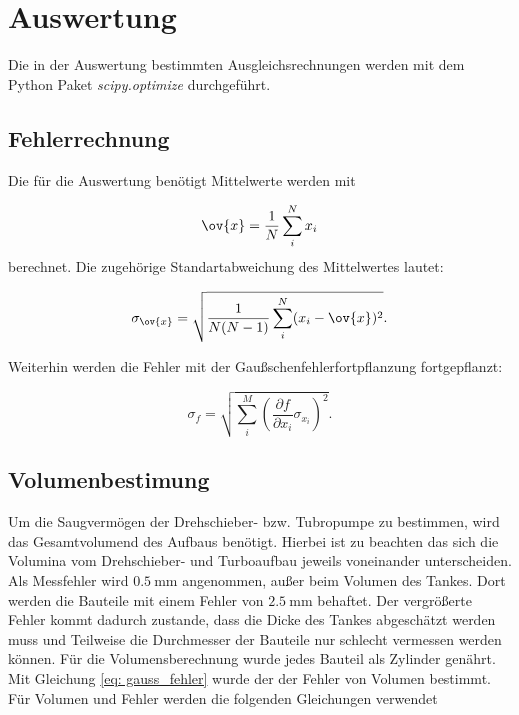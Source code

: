 \section{Auswertung}

Die in der Auswertung bestimmten Ausgleichsrechnungen werden mit
dem Python Paket \emph{scipy.optimize}\cite{scipy} durchgeführt.

\subsection{Fehlerrechnung}

Die für die Auswertung benötigt Mittelwerte werden mit

\begin{equation}
  \label{eq: mittel}
  \ov{x}=\frac{1}{N}\sum_i^N x_i
\end{equation}
berechnet. Die zugehörige Standartabweichung des Mittelwertes lautet:

\begin{equation}
  \label{eq: standartabweichung}
  \sigma_{\ov{x}}=\sqrt{ \frac{1}{N(N-1)} \sum_i^N (x_i-\ov{x})^2}.
\end{equation}

Weiterhin werden die Fehler mit der Gaußschenfehlerfortpflanzung fortgepflanzt:

\begin{equation}
  \label{eq: gauss_fehler}
  \sigma_f= \sqrt{ \sum_i^M \left(\frac{\partial f}{\partial x_i} \sigma_{x_i}\right)^2}.
\end{equation}

\subsection{Volumenbestimung}

Um die Saugvermögen der Drehschieber- bzw. Tubropumpe zu bestimmen, wird das Gesamtvolumend des Aufbaus benötigt.
Hierbei ist zu beachten das sich die Volumina vom Drehschieber- und Turboaufbau jeweils voneinander unterscheiden.
Als Messfehler wird $\SI{0.5}{\milli\meter}$ angenommen, außer beim Volumen des Tankes. Dort werden die
Bauteile mit einem Fehler von $\SI{2.5}{\milli\meter}$ behaftet. Der vergrößerte Fehler kommt dadurch zustande, dass die
Dicke des Tankes abgeschätzt werden muss und Teilweise die Durchmesser der Bauteile nur schlecht vermessen werden können.
Für die Volumensberechnung wurde jedes Bauteil als Zylinder genährt. Mit Gleichung \eqref{eq: gauss_fehler} wurde der
der Fehler von Volumen bestimmt. Für Volumen und Fehler werden die folgenden Gleichungen verwendet

